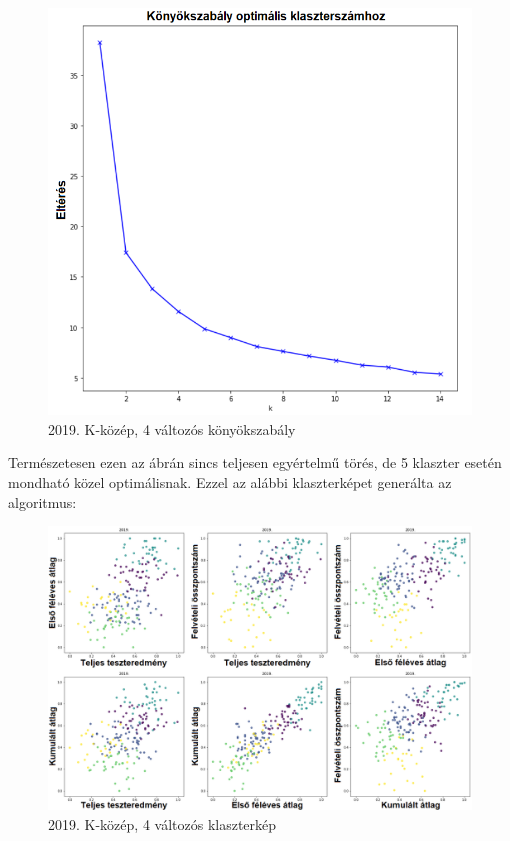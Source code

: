 \documentclass[12pt]{article}
\begin{document}
\begin{figure}[H]
\centering
\includegraphics[scale = 0.6]{kepek/2019_kmeans_best_konyok.png}
\caption{2019. K-közép, 4 változós könyökszabály}
\label{fig:2019_kmeans_best_konyok}
\end{figure}

Természetesen ezen az ábrán sincs teljesen egyértelmű törés, de 5 klaszter esetén mondható közel optimálisnak. Ezzel az alábbi klaszterképet generálta az algoritmus:

\begin{figure}[H]
\centering
\includegraphics[width = \textwidth]{kepek/2019_kmeans_5.png}
\caption{2019. K-közép, 4 változós klaszterkép}
\label{fig:2019_kmeans_5}
\end{figure}
\end{document}
